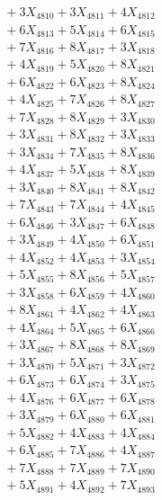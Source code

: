\documentclass[a4paper,10pt]{article}
\begin{document}
{\begin{align}
&\;  + 3 X_{4810} + 3 X_{4811} + 4 X_{4812} \\[0.3ex]
&\;  + 6 X_{4813} + 5 X_{4814} + 6 X_{4815} \\[0.3ex]
&\;  + 7 X_{4816} + 8 X_{4817} + 3 X_{4818} \\[0.3ex]
&\;  + 4 X_{4819} + 5 X_{4820} + 8 X_{4821} \\[0.3ex]
&\;  + 6 X_{4822} + 6 X_{4823} + 8 X_{4824} \\[0.3ex]
&\;  + 4 X_{4825} + 7 X_{4826} + 8 X_{4827} \\[0.3ex]
&\;  + 7 X_{4828} + 8 X_{4829} + 3 X_{4830} \\[0.3ex]
&\;  + 3 X_{4831} + 8 X_{4832} + 3 X_{4833} \\[0.3ex]
&\;  + 3 X_{4834} + 7 X_{4835} + 8 X_{4836} \\[0.3ex]
&\;  + 4 X_{4837} + 5 X_{4838} + 8 X_{4839} \\[0.5ex]\allowbreak
&\;  + 3 X_{4840} + 8 X_{4841} + 8 X_{4842} \\[0.3ex]
&\;  + 7 X_{4843} + 7 X_{4844} + 4 X_{4845} \\[0.3ex]
&\;  + 6 X_{4846} + 3 X_{4847} + 6 X_{4848} \\[0.3ex]
&\;  + 3 X_{4849} + 4 X_{4850} + 6 X_{4851} \\[0.3ex]
&\;  + 4 X_{4852} + 4 X_{4853} + 3 X_{4854} \\[0.3ex]
&\;  + 5 X_{4855} + 8 X_{4856} + 5 X_{4857} \\[0.3ex]
&\;  + 3 X_{4858} + 6 X_{4859} + 4 X_{4860} \\[0.3ex]
&\;  + 8 X_{4861} + 4 X_{4862} + 4 X_{4863} \\[0.3ex]
&\;  + 4 X_{4864} + 5 X_{4865} + 6 X_{4866} \\[0.3ex]
&\;  + 3 X_{4867} + 8 X_{4868} + 8 X_{4869} \\[0.5ex]\allowbreak
&\;  + 3 X_{4870} + 5 X_{4871} + 3 X_{4872} \\[0.3ex]
&\;  + 6 X_{4873} + 6 X_{4874} + 3 X_{4875} \\[0.3ex]
&\;  + 4 X_{4876} + 6 X_{4877} + 6 X_{4878} \\[0.3ex]
&\;  + 3 X_{4879} + 6 X_{4880} + 6 X_{4881} \\[0.3ex]
&\;  + 5 X_{4882} + 4 X_{4883} + 4 X_{4884} \\[0.3ex]
&\;  + 6 X_{4885} + 7 X_{4886} + 4 X_{4887} \\[0.3ex]
&\;  + 7 X_{4888} + 7 X_{4889} + 7 X_{4890} \\[0.3ex]
&\;  + 5 X_{4891} + 4 X_{4892} + 7 X_{4893} \\[0.3ex]

\end{align}}
\end{document}
